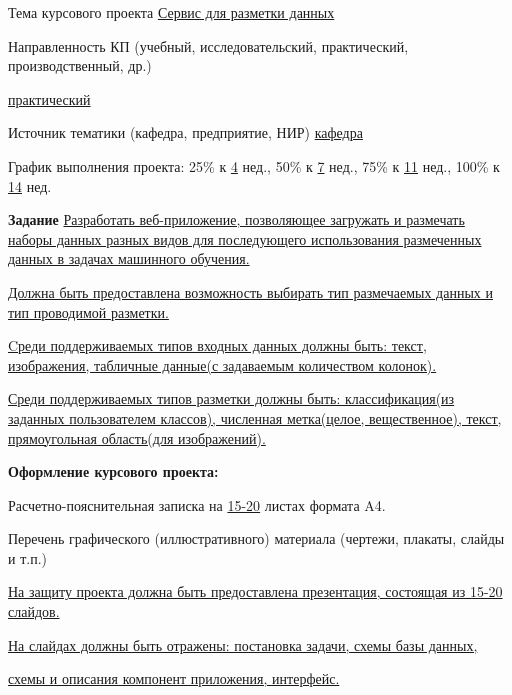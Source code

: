 \begin{titlepage}
\begin{center}
    Тема курсового проекта
    \uline{\hfill Сервис для разметки данных \hfill}


    {\flushleft
    Направленность КП (учебный, исследовательский, практический,
    производственный, др.) 
    \hfill}

    \uline{\hfill
        практический
    \hfill}

    Источник тематики (кафедра, предприятие, НИР)
    \uline{\hfill
        кафедра
    \hfill}

    График выполнения проекта: 
        25\% к \uline{\hfill4\hfill} нед.,
        50\% к \uline{\hfill7\hfill} нед.,
        75\% к \uline{\hfill11\hfill} нед.,
        100\% к \uline{\hfill14\hfill} нед.

    \textbf{Задание}
    \uline{\hfill
        Разработать веб-приложение, позволяющее загружать и размечать наборы данных разных
        видов для последующего использования размеченных данных в задачах машинного обучения.
    \hfill}

    \uline{\hfill 
        Должна быть предоставлена возможность выбирать тип размечаемых данных и тип проводимой разметки. 
    \hfill}

    \uline{\hfill
        Cреди поддерживаемых типов входных данных должны быть: текст, изображения, табличные данные(с задаваемым количеством колонок).
    \hfill}

    \uline{\hfill
        Среди поддерживаемых типов разметки должны быть: классификация(из заданных пользователем классов), численная метка(целое, вещественное), текст, прямоугольная область(для изображений).
    \hfill}

    {\flushleft
    \textbf{Оформление курсового проекта:}
    \hfill}

    {\flushleft
    Расчетно-пояснительная записка на 
    \uline{\hspace{1em}15-20\hspace{1em}}
    листах формата A4.
    \hfill}

    {\flushleft
        Перечень графического (иллюстративного) материала
        (чертежи, плакаты, слайды и т.п.)
    \hfill}

    \uline{\hfill
        На защиту проекта должна быть предоставлена презентация,
        состоящая из 15-20 слайдов.
    \hfill}

    \uline{\hfill
        На слайдах должны быть отражены: постановка задачи,
        схемы базы данных,
    \hfill}

    \uline{\hfill
        схемы и описания компонент приложения, интерфейс.
    \hfill}


\end{center}
\end{titlepage}

